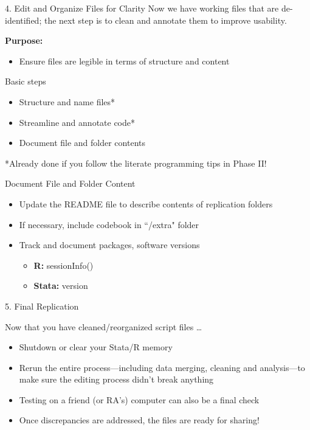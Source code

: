 \documentclass[12pt, compress]{beamer} %
\renewcommand{\texttt}[2][ceruleanblue]{\textcolor{#1}{\ttfamily #2}}%
\let\noteitem\item %
\renewcommand{\item}{ 
	\noteitem\vspace{\fill}
	}
\newcommand{\nb}[1]{{\color{burntorange} {#1}}}
\begin{document}
 	\begin{frame}{4. Edit and Organize Files for Clarity}
 	Now we have working files that are de-identified; the next step is to clean and annotate them to improve usability. 
 	
 	
 	\bigskip
 	
 		\textbf{Purpose:}
 		\begin{itemize}
 			\item Ensure files are \textcolor{burntorange}{legible} in terms of structure and content
 		\end{itemize}
 	\end{frame}
  
 	\begin{frame}{Basic steps}
 		\begin{itemize}
 			\item Structure and name files*
 			\item Streamline and annotate code*
 			\item Document file and folder contents
 		\end{itemize}
 		
 		
 		\bigskip
 		\nb{*Already done if you follow the literate programming tips in Phase II!}
 	\end{frame}
 
\begin{frame}{Document File and Folder Content}
	\begin{itemize}
		\item Update the README file to describe contents of replication folders
		\item If necessary, include codebook in ``\texttt{/extra}" folder
		\item Track and document packages, software versions
		\begin{itemize}
			\item \textbf{R:} \texttt{sessionInfo()}
			\item \textbf{Stata:} \texttt{version}
		\end{itemize}
	\end{itemize}
\end{frame}
	

\begin{frame}{5. Final Replication}
	
		Now that you have cleaned/reorganized script files \dots 
		
		
		\begin{itemize}
			\item Shutdown or clear your Stata/R memory
			\item Rerun the entire process---including data merging, cleaning and analysis---to make sure the editing process didn't break anything
			\item Testing on a friend (or RA's) computer can also be a final check
			\item Once discrepancies are addressed, the files are ready for sharing!
		\end{itemize}
	
\end{frame}
\end{document}
